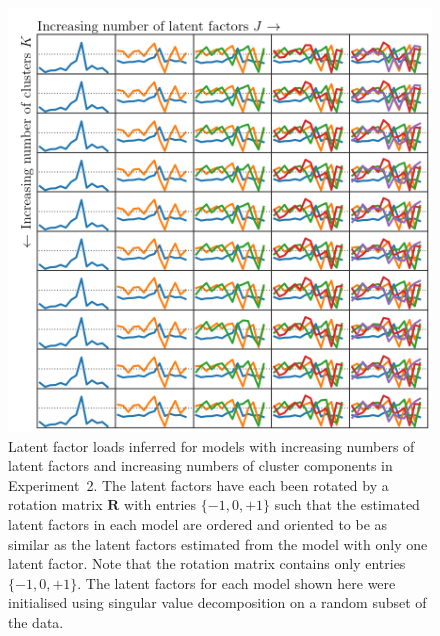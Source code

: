 \documentclass[twocolumn]{aastex61}
\begin{document}
\begin{figure}
	\includegraphics[width=1.0\textwidth]{experiments/galah-experiment-1-gridsearch-factors-wrt-J-and-K.png}
	\caption{Latent factor loads inferred for models with increasing numbers
			 of latent factors and increasing numbers of cluster components
			 in Experiment~2. The latent factors have each been rotated by a
			 rotation matrix $\textbf{R}$ with entries $\{-1, 0, +1\}$ such 
			 that the estimated latent factors in each model are ordered 
			 and oriented to be as similar as the latent factors estimated from
			 the model with only one latent factor. Note that the rotation
			 matrix contains only entries $\{-1, 0, +1\}$. The latent
			 factors for each model shown here were initialised using singular value
			 decomposition on a random subset of the data.
			 }
	\label{fig:experiment-2-gridsearch-factors-init-svd}
\end{figure}
\end{document}
